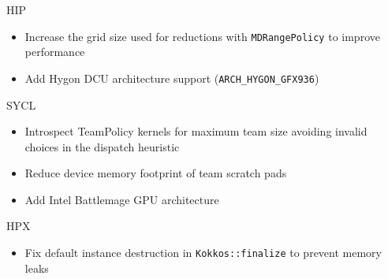 
\begin{frame}[fragile]

  {\Huge HIP}
  \begin{itemize}
	  \item Increase the grid size used for reductions with \texttt{MDRangePolicy} to improve performance
	  \item Add Hygon DCU architecture support (\texttt{ARCH\_HYGON\_GFX936})
  \end{itemize}

\end{frame}


\begin{frame}[fragile]

  {\Huge SYCL}
  \begin{itemize}
    \item Introspect TeamPolicy kernels for maximum team size avoiding invalid choices in the dispatch heuristic
	\item Reduce device memory footprint of team scratch pads
	\item Add Intel Battlemage GPU architecture
  \end{itemize}

\end{frame}






\begin{frame}[fragile]

  {\Huge HPX}
  \begin{itemize}
	  \item Fix default instance destruction in \texttt{Kokkos::finalize} to prevent memory leaks
  \end{itemize}

\end{frame}

